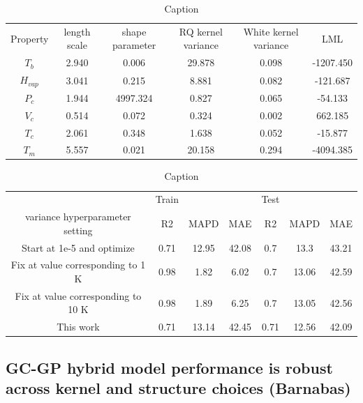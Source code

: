 \documentclass[journal=jacsat,manuscript=article]{achemso}
\begin{document}
\begin{table}[H]
    \centering
    \begin{tabular}{cccccc}
         Property&  length scale&  shape parameter&  RQ kernel variance&  White kernel variance&  LML
\\
         $T_b$&  2.940&  0.006&  29.878&  0.098&  -1207.450
\\
         $H_{vap}$&  3.041&  0.215&  8.881&  0.082&  -121.687
\\
         $P_c$&  1.944&  4997.324&  0.827&  0.065&  -54.133
\\
         $V_c$&  0.514&  0.072&  0.324&  0.002&  662.185
\\
         $T_c$&  2.061&  0.348&  1.638&  0.052&  -15.877
\\
         $T_m$&  5.557&  0.021&  20.158&  0.294&  -4094.385
\\
    \end{tabular}
    \caption{Caption}
    \label{tab:my_label}
\end{table}





\begin{table}[H]
    \centering
    \begin{tabular}{ccccccc}
         &  Train&  &  &  Test&  & 
\\
         variance hyperparameter setting&  R2 &  MAPD&  MAE&  R2 &  MAPD& MAE
\\
         Start at 1e-5 and optimize&  0.71&  12.95&  42.08&  0.7&  13.3& 43.21
\\
         Fix at value corresponding to 1 K &  0.98&  1.82&  6.02&  0.7&  13.06& 42.59
\\
         Fix at value corresponding to 10 K &  0.98&  1.89&  6.25&  0.7&  13.05& 42.56
\\
         This work&  0.71&  13.14&  42.45&  0.71&  12.56& 42.09
\\
    \end{tabular}
    \caption{Caption}
    \label{tab:my_label}
\end{table}


\subsection{GC-GP hybrid model performance is robust across kernel and structure choices (Barnabas) }
\end{document}
